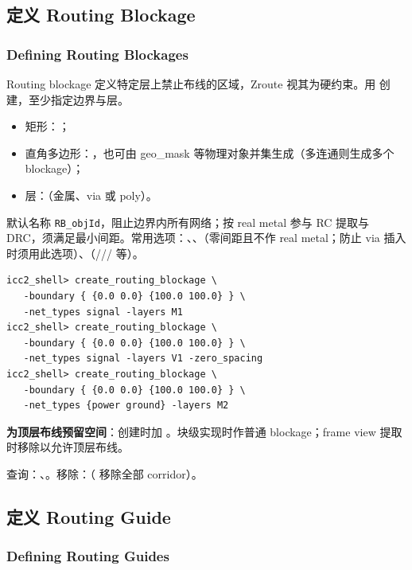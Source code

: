 \subsection{定义 Routing Blockage}
\subsubsection*{Defining Routing Blockages}

Routing blockage 定义特定层上禁止布线的区域，Zroute 视其为硬约束。用  创建，至少指定边界与层。

\begin{itemize}
  \item 矩形：；
  \item 直角多边形：，也可由 geo\_mask 等物理对象并集生成（多连通则生成多个 blockage）；
  \item 层：（金属、via 或 poly）。
\end{itemize}

默认名称 \texttt{RB\_objId}，阻止边界内所有网络；按 real metal 参与 RC 提取与 DRC，须满足最小间距。常用选项：、、（零间距且不作 real metal；防止 via 插入时须用此选项）、（/// 等）。

\begin{lstlisting}
icc2_shell> create_routing_blockage \
   -boundary { {0.0 0.0} {100.0 100.0} } \
   -net_types signal -layers M1
icc2_shell> create_routing_blockage \
   -boundary { {0.0 0.0} {100.0 100.0} } \
   -net_types signal -layers V1 -zero_spacing
icc2_shell> create_routing_blockage \
   -boundary { {0.0 0.0} {100.0 100.0} } \
   -net_types {power ground} -layers M2
\end{lstlisting}

\textbf{为顶层布线预留空间}：创建时加 。块级实现时作普通 blockage；frame view 提取时移除以允许顶层布线。

查询：\cmd{get\_routing\_blockages}、。移除：（ 移除全部 corridor）。

\subsection{定义 Routing Guide}
\subsubsection*{Defining Routing Guides}

